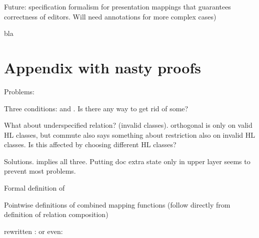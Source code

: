 Future: specification formalism for presentation mappings that guarantees correctness of editors. Will need annotations for more complex cases)

\pagebreak
bla
\pagebreak
\section{Appendix with nasty proofs}

Problems:


Three conditions:   and . Is there any way to get rid of some?

What about underspecified relation? (invalid classes). orthogonal is only on valid HL classes, but commute also says something about  restriction also on invalid HL classes. Is this affected by choosing different HL classes?

Solutions.
 implies all three. Putting doc extra state only in upper layer seems to prevent most problems.

Formal definition of \valid
{}

Pointwise definitions of combined mapping functions (follow directly from definition of relation composition)


rewritten :
or even:

